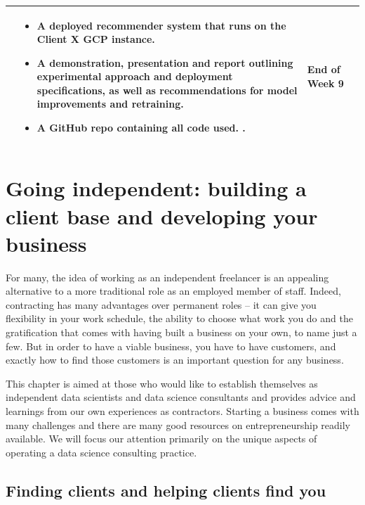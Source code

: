 \documentclass[
]{book}
\providecommand{\tightlist}{%
  \setlength{\itemsep}{0pt}\setlength{\parskip}{0pt}}
\begin{document}
\begin{longtable}[]{@{}llll@{}}
\begin{minipage}[t]{0.30\columnwidth}
\begin{itemize}
\end{itemize}\strut
\end{minipage} & \begin{minipage}[t]{0.30\columnwidth}\raggedright
\begin{itemize}
\tightlist
\item
  A deployed
  recommender system
  that runs on the
  Client X GCP instance.
\item
  A demonstration,
  presentation and
  report outlining
  experimental approach
  and deployment
  specifications, as
  well as
  recommendations for
  model improvements and
  retraining.
\item
  A GitHub repo
  containing all code
  used.
  .
\end{itemize}\strut
\end{minipage} & \begin{minipage}[t]{0.15\columnwidth}\raggedright
End
of
Week
9\strut
\end{minipage}\tabularnewline
\bottomrule
\end{longtable}

\hypertarget{consulting}{%
\chapter{Going independent: building a client base and developing your business}\label{consulting}}

For many, the idea of working as an independent freelancer is an appealing alternative to a more traditional role as an employed member of staff. Indeed, contracting has many advantages over permanent roles -- it can give you flexibility in your work schedule, the ability to choose what work you do and the gratification that comes with having built a business on your own, to name just a few. But in order to have a viable business, you have to have customers, and exactly how to find those customers is an important question for any business.

This chapter is aimed at those who would like to establish themselves as independent data scientists and data science consultants and provides advice and learnings from our own experiences as contractors. Starting a business comes with many challenges and there are many good resources on entrepreneurship readily available. We will focus our attention primarily on the unique aspects of operating a data science consulting practice.

\hypertarget{finding-clients-and-helping-clients-find-you}{%
\section{Finding clients and helping clients find you}\label{finding-clients-and-helping-clients-find-you}}
\end{document}
